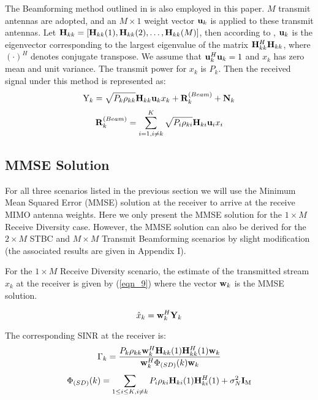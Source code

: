 \documentclass[draftcls,onecolumn,peerview,12pt]{IEEEtran}
\begin{document}
The Beamforming method outlined in \cite{15_Chen2006, 18_coded_MIMO}
is also employed in this paper. $M$ transmit antennas are adopted,
and an $M \times 1$ weight vector ${\rm{\bf u}}_{k}$ is applied to
these transmit antennas. Let ${\rm{\bf H}}_{kk}=\left[ {\rm{\bf
H}}_{kk}(1),{\rm{\bf H}}_{kk}(2),\ldots,{\rm{\bf
H}}_{kk}(M)\right]$, then according to \cite{15_Chen2006,
18_coded_MIMO}, ${\rm{\bf u}}_k$ is the eigenvector corresponding to
the largest eigenvalue of the matrix ${\rm{\bf H}}_{kk}^{H}{\rm{\bf
H}}_{kk}$, where $(\cdot)^{H}$ denotes conjugate transpose. We
assume that ${\rm{\bf u}}_k^{H}{\rm{\bf u}}_k=1$ and $x_k$ has zero
mean and unit variance. The transmit power for $x_k$ is $P_k$. Then
the received signal under this method is represented as:
\begin{equation}
\mbox{Y}_k =\sqrt {P_k \rho _{kk} } {\rm {\bf H}}_{kk} {\rm {\bf
u}}_k x_k +{\rm {\bf R}}_k^{(Beam)} +{\rm {\bf N}}_k
\end{equation}
\begin{equation}
{\rm {\bf R}}_k^{(Beam)} =\sum\limits_{i=1,i\ne k}^K {\sqrt {P_i
\rho _{ki} } {\rm {\bf H}}_{ki} {\rm {\bf u}}_i x_i }
\end{equation}

\subsection{MMSE Solution}
For all three scenarios listed in the previous section we will use
the Minimum Mean Squared Error (MMSE) solution at the receiver
\cite{13_JointOptimal1998, 20_MMSE, 21_Spatial_Multiplexing} to
arrive at the receive MIMO antenna weights. Here we only present the
MMSE solution for the $1 \times M$ Receive Diversity case. However,
the MMSE solution can also be derived for the $2 \times M$ STBC and
$M \times M$ Transmit Beamforming scenarios by slight modification
(the associated results are given in Appendix I).

For the $1 \times M$ Receive Diversity scenario, the estimate of the
transmitted stream $x_{k}$ at the receiver is given by (\ref{eqn_9})
where the vector ${\rm {\bf w}}_k $ is the MMSE solution.

\begin{equation}
\label{eqn_9} \hat{x}_k = {\rm{\bf w}}_k^{H} {\rm{\bf Y}}_k
\end{equation}


The corresponding SINR at the receiver is:
\begin{equation}
\Gamma _k =\frac{P_k \rho _{kk} {\rm {\bf w}}_k^H {\rm {\bf H}}_{kk}
(1){\rm {\bf H}}_{kk}^H (1){\rm {\bf w}}_k }{{\rm {\bf w}}_k^H
\Phi_{(SD)}(k){\rm {\bf w}}_k }
\end{equation}
\begin{equation}
\label{eqn_12} \Phi_{(SD)}(k) = \sum\limits_{1\leq i \leq K, i \neq
k} P_i \rho_{ki} {\rm{\bf H}}_{ki}(1) {{\rm{\bf H}}_{ki}^{H}}(1) +
\sigma_N^{2}\rm{\bf I}_M
\end{equation}
\end{document}
